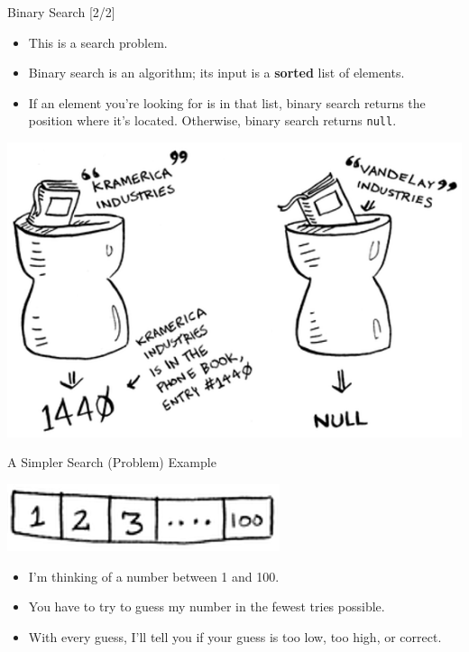 \documentclass[ignorenonframetext,]{beamer}
\providecommand{\tightlist}{%
  \setlength{\itemsep}{0pt}\setlength{\parskip}{0pt}}
\begin{document}
\begin{frame}[fragile]{Binary Search {[}2/2{]}}
\protect\hypertarget{binary-search-22}{}

\begin{itemize}
\tightlist
\item
  This is a search problem.
\item
  Binary search is an algorithm; its input is a \textbf{sorted} list of
  elements.
\item
  If an element you're looking for is in that list, binary search
  returns the position where it's located. Otherwise, binary search
  returns \texttt{null}.
\end{itemize}

\includegraphics{./Chapter01-figure/phonebook_search.png}

\end{frame}

\begin{frame}{A Simpler Search (Problem) Example}
\protect\hypertarget{a-simpler-search-problem-example}{}

\includegraphics{./Chapter01-figure/number_search.png}

\begin{itemize}
\tightlist
\item
  I'm thinking of a number between 1 and 100.
\item
  You have to try to guess my number in the fewest tries possible.
\item
  With every guess, I'll tell you if your guess is too low, too high, or
  correct.
\end{itemize}

\end{frame}
\end{document}
